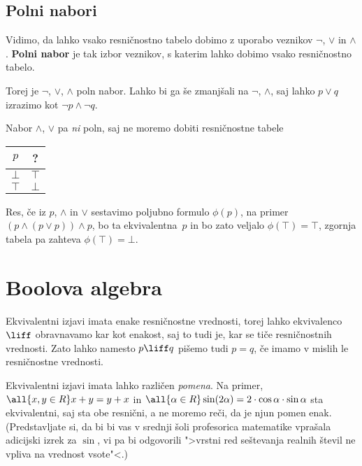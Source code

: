 \subsection{Polni nabori}
\label{sec:polni-nabori}

Vidimo, da lahko vsako resničnostno tabelo dobimo z uporabo veznikov $\neg$, $\lor$ in
$\land$. \textbf{Polni nabor} je tak izbor veznikov, s katerim lahko dobimo vsako
resničnostno tabelo.

Torej je $\neg$, $\lor$, $\land$ poln nabor. Lahko bi ga še zmanjšali na $\neg$, $\land$, saj lahko $p \lor q$ izrazimo kot $\neg p \land \neg q$.

Nabor $\land$, $\lor$ pa \emph{ni} poln, saj ne moremo dobiti resničnostne tabele
%
\begin{center}
  \begin{tabular}{cc}
    \toprule
    $p$ & ? \\ \midrule
    $\bot$ & $\top$ \\
    $\top$ & $\bot$ \\
    \bottomrule
  \end{tabular}
\end{center}
%
Res, če iz $p$, $\land$ in $\lor$ sestavimo poljubno formulo $\phi(p)$, na primer $(p \land (p \lor p)) \land p$, bo ta ekvivalentna~$p$ in bo zato veljalo $\phi(\top) = \top$, zgornja tabela pa zahteva $\phi(\top) = \bot$.


\section{Boolova algebra}

Ekvivalentni izjavi imata enake resničnostne vrednosti, torej lahko ekvivalenco
$\liff$ obravnavamo kar kot enakost, saj to tudi je, kar se tiče resničnostnih
vrednosti. Zato lahko namesto $p \liff q$ pišemo tudi $p = q$, če imamo v mislih le
resničnostne vrednosti.

\begin{opomba}
  Ekvivalentni izjavi imata lahko različen \emph{pomena}. Na primer,
  $\all{x, y \in R} x + y = y + x$ in
  $\all{\alpha \in R} \sin(2 \alpha) = 2 \cdot \cos \alpha \cdot \sin \alpha$ sta
  ekvivalentni, saj sta obe resnični, a ne moremo reči, da je njun pomen enak. (Predstavljate si, da bi bi vas v srednji šoli profesorica matematike vprašala adicijski izrek za $\sin$, vi pa bi odgovorili ">vrstni red seštevanja realnih števil ne vpliva na vrednost vsote"<.)
\end{opomba}


